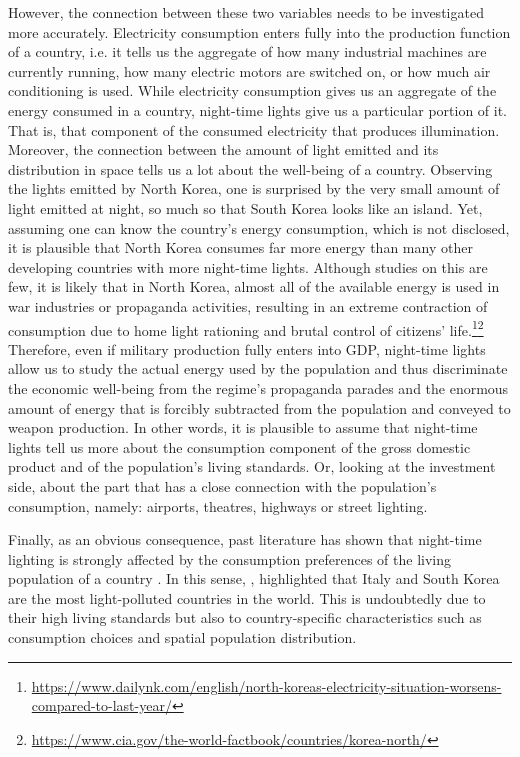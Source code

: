 However, the connection between these two variables needs to be investigated more accurately. 
Electricity consumption enters fully into the production function of a country, i.e. it tells us the aggregate of how many industrial machines are currently running, how many electric motors are switched on, or how much air conditioning is used. While electricity consumption gives us an aggregate of the energy consumed in a country, night-time lights give us a particular portion of it. That is, that component of the consumed electricity that produces illumination. 
Moreover, the connection between the amount of light emitted and its distribution in space tells us a lot about the well-being of a country. 
Observing the lights emitted by North Korea, one is surprised by the very small amount of light emitted at night, so much so that South Korea looks like an island. Yet, assuming one can know the country's energy consumption, which is not disclosed, it is plausible that North Korea consumes far more energy than many other developing countries with more night-time lights. Although studies on this are few, it is likely that in North Korea, almost all of the available energy is used in war industries or propaganda activities, resulting in an extreme contraction of consumption due to home light rationing and brutal control of citizens' life.\footnote{\url{https://www.dailynk.com/english/north-koreas-electricity-situation-worsens-compared-to-last-year/}}\footnote{\url{https://www.cia.gov/the-world-factbook/countries/korea-north/}}
Therefore, even if military production fully enters into GDP, night-time lights allow us to study the actual energy used by the population and thus discriminate the economic well-being from the regime's propaganda parades and the enormous amount of energy that is forcibly subtracted from the population and conveyed to weapon production.
In other words, it is plausible to assume that night-time lights tell us more about the consumption component of the gross domestic product and of the population's living standards. Or, looking at the investment side, about the part that has a close connection with the population's consumption, namely: airports, theatres, highways or street lighting. 

Finally, as an obvious consequence, past literature has shown that night-time lighting is strongly affected by the consumption preferences of the living population of a country \citep{cinzano1999mapping}. 
In this sense, \cite{falchi2016new}, highlighted that Italy and South Korea are the most light-polluted countries in the world. This is undoubtedly due to their high living standards but also to country-specific characteristics such as consumption choices and spatial population distribution.

